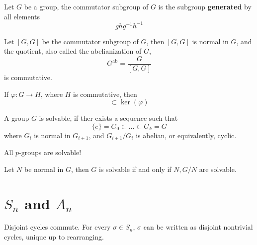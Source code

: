 \documentclass[openany]{book}
\begin{document}
\begin{defn}
    Let $G$ be a group, the commutator subgroup of $G$ is the subgroup \textbf{generated} by all elements 
    \begin{equation*}
        ghg^{-1}h^{-1}
    \end{equation*}
\end{defn}


\begin{prop}
    Let $[G,G]$ be the commutator subgroup of $G$, then $[G,G]$ is normal in $G$, and the quotient, also called the abelianization of $G$, 
    \begin{equation*}
        G^{\text{ab}}=\frac{G}{[G,G]}
    \end{equation*}
    is commutative.
\end{prop}


\begin{thm}
    If $\varphi: G\to H$, where $H$ is commutative, then 
    \begin{equation*}
        [G,G]\subset\ker(\varphi)
    \end{equation*}
\end{thm}

\begin{defn}
    A group $G$ is solvable, if ther exists a sequence such that 
    \begin{equation*}
        \{e\}=G_0\subset\dots\subset G_k=G
    \end{equation*}
    where $G_i$ is normal in $G_{i+1}$, and $G_{i+1}/G_i$ is abelian, or equivalently, cyclic.
\end{defn}




\begin{prop}
    All $p$-groups are solvable!
\end{prop}

\begin{prop}
    Let $N$ be normal in $G$, then $G$ is solvable if and only if $N, G/N$ are solvable.
\end{prop}


\section{$S_n$ and $A_n$}

\begin{prop}
    Disjoint cycles commute. For every $\sigma\in S_n$, $\sigma$ can be written as disjoint nontrivial cycles, unique up to rearranging.
\end{prop}
\end{document}
